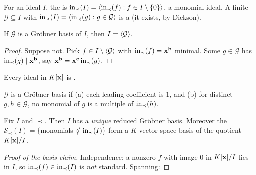 For an ideal $I$, the  is $\operatorname{in}_\prec(I)=\langle \operatorname{in}_\prec(f):f\in I\setminus\{0\}\rangle$,
a monomial ideal. A finite $\mathcal G\subseteq I$ with $\operatorname{in}_\prec(I)=\langle \operatorname{in}_\prec(g):g\in\mathcal G\rangle$
is a  (it exists, by Dickson).

\begin{theorem}\label{thm:gb-gen}
If $\mathcal G$ is a Gröbner basis of $I$, then $I=\langle \mathcal G\rangle$.
\end{theorem}
\begin{proof}
Suppose not. Pick $f\in I\setminus\langle \mathcal G\rangle$ with $\operatorname{in}_\prec(f)=\mathbf{x}^{\mathbf b}$ minimal.
Some $g\in\mathcal G$ has $\operatorname{in}_\prec(g)\mid\mathbf{x}^{\mathbf b}$, say $\mathbf{x}^{\mathbf b}=\mathbf{x}^{\mathbf c}\operatorname{in}_\prec(g)$.
\end{proof}

\begin{corollary}\label{cor:hbt}
Every ideal in $K[\mathbf{x}]$ is \fillin[3.5cm].
\end{corollary}


\begin{definition}
$\mathcal G$ is a  Gröbner basis if (a) each leading coefficient is $1$, and (b) for
distinct $g,h\in\mathcal G$, no monomial of $g$ is a multiple of $\operatorname{in}_\prec(h)$.
\end{definition}

\begin{theorem}\label{thm:reduced}
Fix $I$ and $\prec$. Then $I$ has a \emph{unique} reduced Gröbner basis. Moreover the
 $\mathcal S_\prec(I)=\{$monomials $\notin\operatorname{in}_\prec(I)\}$ form a
$K$-vector-space basis of the quotient $K[\mathbf{x}]/I$.
\end{theorem}
\begin{proof}[Proof of the basis claim]
Independence: a nonzero $f$ with image $0$ in $K[\mathbf{x}]/I$ lies in $I$, so $\operatorname{in}_\prec(f)\in\operatorname{in}_\prec(I)$
is \emph{not} standard. Spanning: 
\end{proof}

